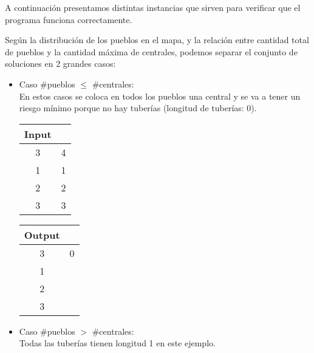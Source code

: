 \documentclass[11pt, a4paper, twoside]{article}
\begin{document}
{}

A continuación presentamos distintas instancias que sirven para  verificar que
el programa funciona correctamente.

\begin{paragraph}{}
Según la distribución de los pueblos en el mapa, y la relación entre cantidad
total de pueblos y la cantidad  máxima de centrales, podemos separar el conjunto
de soluciones en 2 grandes casos:
\end{paragraph}

\begin{itemize}
	\item Caso \#pueblos $\le$ \#centrales: \\
		En estos casos se coloca en todos los pueblos una central y se va a tener un riesgo mínimo 
		porque no hay tuberías (longitud de tuberías: 0). \\
		
		 \begin{minipage}{0.2\textwidth}
			\begin{tabular}{cc}
			   Input \\
			   \hline
			   3 & 4 \\
			   1 & 1 \\
			   2 & 2 \\
			   3 & 3 \\
			\end{tabular}
		\end{minipage} 
		\begin{minipage}{0.2\textwidth}
			\begin{tabular}{cc}
			   Output \\
			   \hline
			   3 & 0 \\
			   1 &  \\
			   2 &  \\
			   3 &  \\
			\end{tabular}
		\end{minipage} 
		
	\item Caso \#pueblos  $>$ \#centrales: \\
		Todas las tuberías tienen longitud 1 en este ejemplo. \\
		

\end{itemize}
\end{document}
